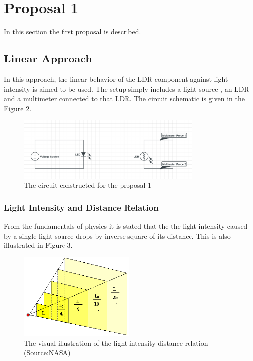 \documentclass[letterpaper,12pt]{article}
\begin{document}
\section{Proposal 1}
In this section the first proposal is described.
\subsection{Linear Approach}
In this approach, the linear behavior of the LDR component against light intensity is aimed to be used. The setup simply includes a light source , an LDR and a multimeter connected to that LDR. The circuit schematic is given in the Figure 2.
\begin{figure}[H]
	\centering
   \includegraphics[width=0.8\textwidth]{circuit1.png}
   \caption{The circuit constructed for the proposal 1}
\end{figure} 

\subsubsection{Light Intensity and Distance Relation}
From the fundamentals of physics it is stated that the the light intensity caused by a single light source drops by inverse square of its distance. This is also illustrated in Figure 3.
\begin{figure}[H]
	\centering
   \includegraphics[width=0.5\textwidth]{light_intensity_vs_distance.png}
   \caption{The visual illustration of the light intensity distance relation (Source:NASA)}
\end{figure} 
\end{document}
